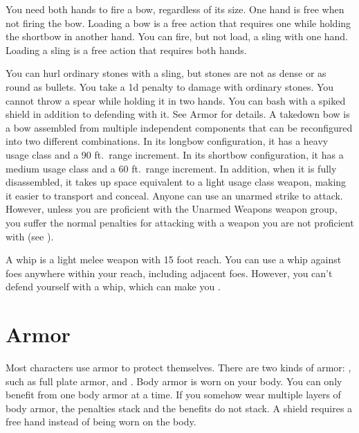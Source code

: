          You need both hands to fire a bow, regardless of its size. One hand is free when not firing the bow. Loading a bow is a free action that requires one  while holding the shortbow in another hand.
         You can fire, but not load, a sling with one hand. Loading a sling is a free action that requires both hands.
        \par You can hurl ordinary stones with a sling, but stones are not as dense or as round as bullets. You take a \minus1d penalty to damage with ordinary stones.
         You cannot throw a spear while holding it in two hands.
         You can bash with a spiked shield in addition to defending with it. See Armor for details.
         A takedown bow is a bow assembled from multiple independent components that can be reconfigured into two different combinations.
        In its longbow configuration, it has a heavy usage class and a 90 ft.\ range increment.
        In its shortbow configuration, it has a medium usage class and a 60 ft.\ range increment.
        In addition, when it is fully disassembled, it takes up space equivalent to a light usage class weapon, making it easier to transport and conceal.
         Anyone can use an unarmed strike to attack.
        However, unless you are proficient with the Unarmed Weapons weapon group, you suffer the normal penalties for attacking with a weapon you are not proficient with (see ).

         A whip is a light melee weapon with 15 foot reach.
        You can use a whip against foes anywhere within your reach, including adjacent foes.
        However, you can't defend yourself with a whip, which can make you .

\section{Armor}\label{Armor}

    Most characters use armor to protect themselves. There are two kinds of armor: , such as full plate armor, and .
    Body armor is worn on your body.
    You can only benefit from one body armor at a time.
    If you somehow wear multiple layers of body armor, the penalties stack and the benefits do not stack.
    A shield requires a free hand instead of being worn on the body.


